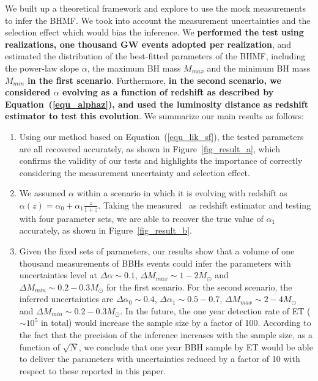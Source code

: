 \documentclass[twocolumn]{aastex62}
\newcommand{\blue}[1]{{\bf #1}}
\begin{document}
We built up a theoretical framework and explore to use the mock measurements to infer the BHMF. We took into account the measurement uncertainties and the selection effect which would bias the inference. We \blue{performed the test using realizations, one thousand GW events adopted per realization}, and estimated the distribution of the best-fitted parameters of the BHMF, including the power-law slope $\alpha$, the maximum BH mass $M_{max}$ and the minimum BH mass $M_{min}$ \blue{in the first scenario}. Furthermore, \blue{in the second scenario, we considered  $\alpha$ evolving as a function of redshift as described by Equation~(\ref{equ_alphaz}), and used the luminosity distance as redshift estimator to test this evolution}. We summarize our main results as follows:
\blue{
\begin{enumerate}
\item Using our method based on Equation~(\ref{equ_lik_sf}), the tested parameters are all recovered accurately, as shown in Figure~\ref{fig_result_a}, which confirms the validity of our tests and highlights the importance of correctly considering the measurement uncertainty and selection effect.
\item We assumed $\alpha$ within a scenario in which it is evolving with redshift as $\alpha(z) = \alpha_0 + \alpha_1\frac{z}{1+z}$. Taking the measured \dl\ as redshift estimator and testing with four parameter sets, we are able to recover the true value of $\alpha_1$ accurately, as shown in Figure~\ref{fig_result_b}.
\item Given the fixed sets of parameters, our results show that a volume of one thousand measurements of BBHs events could infer the parameters with uncertainties level at $\Delta\alpha\sim0.1$, $\Delta M_{max}\sim1-2M_{\odot}$ and $\Delta M_{min}\sim0.2-0.3M_{\odot}$ for the first scenario. For the second scenario, the inferred uncertainties are $\Delta\alpha_0\sim0.4$, $\Delta\alpha_1\sim0.5-0.7$, $\Delta M_{max}\sim2-4M_{\odot}$ and $\Delta M_{min}\sim0.2-0.3M_{\odot}$. In the future, the one year detection rate of ET ($\sim10^5$ in total) would increase the sample size by a factor of 100. According to the fact that the precision of the inference increases with the sample size, as a function of $\sqrt{N}$, we conclude that one year BBH sample by ET would be able to deliver the parameters with uncertainties reduced by a factor of 10 with respect to these reported in this paper.
\end{enumerate}
}
\end{document}
